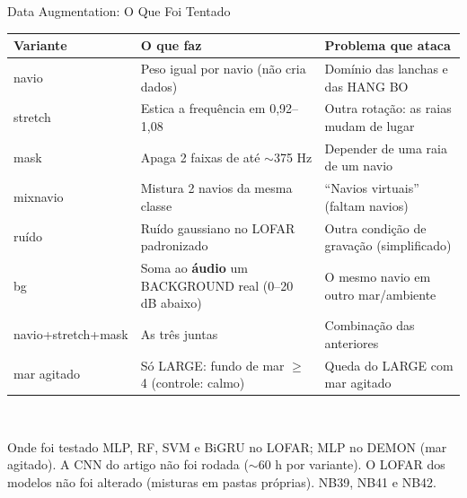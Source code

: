 \documentclass[aspectratio=169]{beamer}
\begin{document}
\begin{frame}{Data Augmentation: O Que Foi Tentado}
    \scriptsize
    \centering
    \setlength{\tabcolsep}{4pt}
    \begin{tabularx}{\textwidth}{@{}l>{\raggedright\arraybackslash}X>{\raggedright\arraybackslash}X@{}}
        \toprule
        Variante & O que faz & Problema que ataca \\
        \midrule
        navio & Peso igual por navio (não cria dados) & Domínio das lanchas e das HANG BO \\
        stretch & Estica a frequência em 0,92--1,08 & Outra rotação: as raias mudam de lugar \\
        mask & Apaga 2 faixas de até $\sim$375 Hz & Depender de uma raia de um navio \\
        mixnavio & Mistura 2 navios da mesma classe & ``Navios virtuais'' (faltam navios) \\
        ruído & Ruído gaussiano no LOFAR padronizado & Outra condição de gravação (simplificado) \\
        bg & Soma ao \textbf{áudio} um BACKGROUND real (0--20 dB abaixo) & O mesmo navio em outro mar/ambiente \\
        navio+stretch+mask & As três juntas & Combinação das anteriores \\
        mar agitado & Só LARGE: fundo de mar $\geq$ 4 (controle: calmo) & Queda do LARGE com mar agitado \\
        \bottomrule
    \end{tabularx}\\[3pt]
    \begin{block}{\small Onde foi testado}
        \scriptsize
        MLP, RF, SVM e BiGRU no LOFAR; MLP no DEMON (mar agitado). A CNN do artigo não foi rodada ($\sim$60 h por variante). O LOFAR dos modelos não foi alterado (misturas em pastas próprias). NB39, NB41 e NB42.
    \end{block}
\end{frame}
\end{document}
